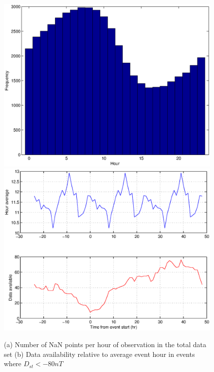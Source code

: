 \documentclass[10pt,twocolumn]{article}
\begin{document}
\begin{figure}[htp]
\centering
\includegraphics[scale=0.5]{paperfigures/nansbyhour.eps}
\includegraphics[scale=0.5]{paperfigures/nansbyhour_storm.eps}
\caption{(a) Number of NaN points per hour of observation in the total data set (b) Data availability relative to average event hour in events where $D_{st}<-80nT$}
\label{nanperhour}
\end{figure}
\clearpage
\end{document}
